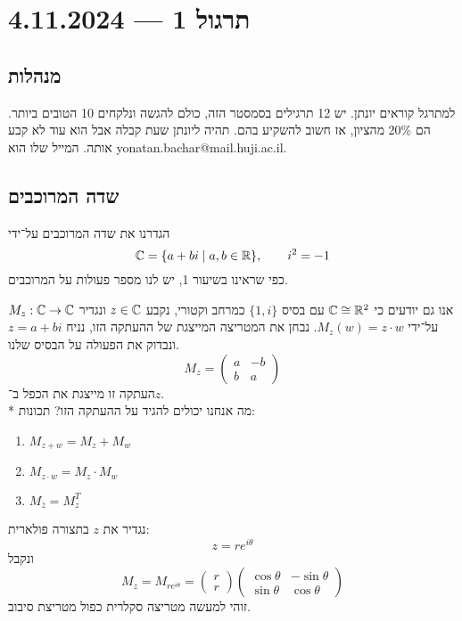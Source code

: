 \section{תרגול 1 --- 4.11.2024}
\subsection{מנהלות}
למתרגל קוראים יונתן.
יש 12 תרגילים בסמסטר הזה, כולם להגשה ונלקחים 10 הטובים ביותר.
הם 20\% מהציון, אז חשוב להשקיע בהם.
תהיה ליונתן שעת קבלה אבל הוא עוד לא קבע אותה.
המייל שלו הוא yonatan.bachar@mail.huji.ac.il.

\subsection{שדה המרוכבים}
הגדרנו את שדה המרוכבים על־ידי
\[
	\mathbb{C} = \{ a + bi \mid a, b \in \mathbb{R} \},
	\qquad i^2 = -1
\]
כפי שראינו בשיעור 1, יש לנו מספר פעולות על המרוכבים.

אנו גם יודעים כי $\mathbb{C} \cong \mathbb{R}^2$ עם בסיס $\{ 1, i \}$ כמרחב וקטורי, נקבע $z \in \mathbb{C}$ ונגדיר $M_z : \mathbb{C} \to \mathbb{C}$ על־ידי $M_z(w) = z \cdot w$.
נבחן את המטריצה המייצגת של ההעתקה הזו, נניח $z = a + bi$ ונבדוק את הפעולה על הבסיס שלנו.
\[
	M_z = \begin{pmatrix}
		a & -b \\
		b & a
	\end{pmatrix}
\]
העתקה זו מייצגת את הכפל ב־$z$. \\*
מה אנחנו יכולים להגיד על ההעתקה הזו?
תכונות:
\begin{enumerate}
	\item $M_{z + w} = M_z + M_w$
	\item $M_{z \cdot w} = M_z \cdot M_w$
	\item $M_{\overline{z}} = M_z^T$
\end{enumerate}
נגדיר את $z$ בתצורה פולארית:
\[
	z = r e^{i \theta}
\]
ונקבל
\[
	M_z = M_{r e^{i\theta}}
	= \begin{pmatrix}
		r \\
		r
	\end{pmatrix}
	\begin{pmatrix}
		\cos \theta & - \sin \theta \\
		\sin \theta & \cos \theta
	\end{pmatrix}
\]
זוהי למעשה מטריצה סקלרית כפול מטריצת סיבוב.

